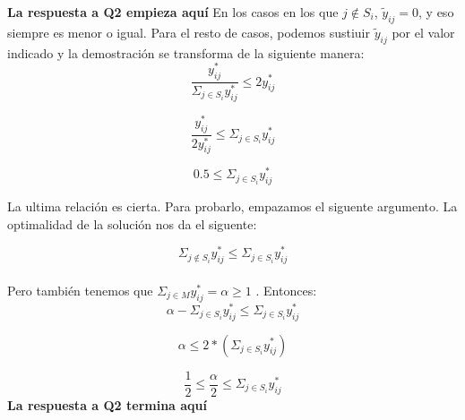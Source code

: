 \textbf{La respuesta a Q2 empieza aquí}
En los casos en los que $j \notin S_i$, $\tilde{y}_{ij} = 0$, y eso siempre es menor o igual.
Para el resto de casos, podemos sustiuir $\tilde{y}_{ij}$ por el valor indicado y la demostración se transforma de la siguiente manera:
\begin{equation}
 \frac{y^*_{ij}}{\Sigma_{j \in S_i} y^*_{ij}} \leq 2y^*_{ij}
\end{equation}

\begin{equation}
 \frac{y^*_{ij}}{2y^*_{ij}} \leq \Sigma_{j \in S_i} y^*_{ij}
\end{equation}

\begin{equation}
 0.5 \leq \Sigma_{j \in S_i} y^*_{ij}
\end{equation}

La ultima relación es cierta. Para probarlo, empazamos el siguente argumento. La optimalidad de la solución nos da el siguente: 

\begin{equation}
 \Sigma_{j \notin S_i} y^*_{ij} \leq \Sigma_{j \in S_i} y^*_{ij}
\end{equation}
\\
Pero también tenemos que $\Sigma_{j \in M} y^*_{ij} = \alpha \geq 1 $ . Entonces:
\\
\begin{equation}
 \alpha - \Sigma_{j \in S_i} y^*_{ij} \leq \Sigma_{j \in S_i} y^*_{ij}
\end{equation}

\begin{equation}
 \alpha  \leq 2 * (\Sigma_{j \in S_i} y^*_{ij})
\end{equation}

\begin{equation}
 \frac{1}{2} \leq \frac{\alpha}{2} \leq \Sigma_{j \in S_i} y^*_{ij}
\end{equation}
\textbf{La respuesta a Q2 termina aquí}
